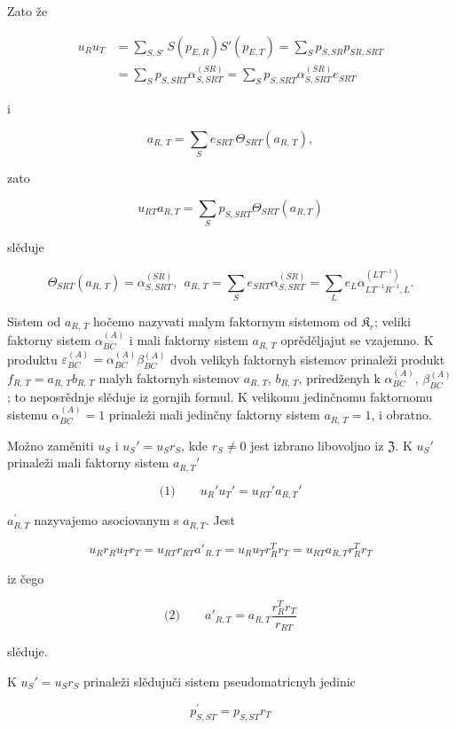 \documentclass[11pt]{article}
\begin{document}
Zato že

\[
\begin{aligned}
u_Ru_T
&=\sum_{S,S'} S(p_{E,R})S'(p_{E,T})
=\sum_S p_{S,SR}p_{SR,SRT}\\
&=\sum_S p_{S,SRT}\alpha_{S,SRT}^{(SR)}
=\sum_S p_{S,SRT}\alpha_{S,SRT}^{(SR)}e_{SRT}
\end{aligned}
\]

i

\[a_{R,\,T} = \sum\limits_{S} e_{SRT}\, \Theta_{SRT} \left(a_{R,\,T}\right),\]

zato

\[u_{RT} a_{R,T} = \sum\limits_{S} p_{S,SRT} \Theta_{SRT} (a_{R,T})\]

slěduje

\[\Theta_{SRT}(a_{R,\,T}) = \alpha_{S,SRT}^{(SR)}, ~~ a_{R,\,T} = \sum\limits_{S} e_{SRT} \alpha_{S,SRT}^{(SR)} = \sum\limits_{L} e_{L} \alpha_{LT^{-1}R^{-1},L}^{(LT^{-1})}.\]

Sistem od \(a_{R,\,T}\) hočemo nazyvati malym faktornym sistemom od \(\mathfrak K_r\); veliki faktorny sistem \(\alpha_{BC}^{(A)}\) i mali faktorny sistem \(a_{R,\,T}\) oprěděljajut se vzajemno. K produktu \(\varepsilon_{BC}^{(A)} = \alpha_{BC}^{(A)} \beta_{BC}^{(A)}\) dvoh velikyh faktornyh sistemov prinaleži produkt \(f_{R,\,T} = a_{R,\,T}b_{R,\,T}\) malyh faktornyh sistemov \(a_{R,\,T}\), \(b_{R,\,T}\), priredženyh k \(\alpha_{BC}^{(A)}\), \(\beta_{BC}^{(A)}\); to neposrědnje slěduje iz gornjih formul. K velikomu jedinčnomu faktornomu sistemu \(\alpha_{BC}^{(A)} = 1\) prinaleži mali jedinčny faktorny sistem \(a_{R,\,T} = 1\), i obratno.

Možno zaměniti \(u_S\) i \(u_S'=u_Sr_S\), kde \(r_S\neq 0\) jest izbrano libovoljno iz \(\mathfrak Z\). K \(u_S'\) prinaleži mali faktorny sistem \(a_{R,T}'\)

\[
\text{(1)}\qquad u_R'u_T'=u_{RT}'a_{R,T}'
\]

\(a_{R,T}^{\prime}\) nazyvajemo asociovanym s \(a_{R,T}\). Jest

\[u_R r_R u_T r_T = u_{RT} r_{RT} a'_{R,T} = u_R u_T r_R^T r_T = u_{RT} a_{R,T} r_R^T r_T\]

iz čego

\[
\text{(2)}\qquad a'_{R,T}=a_{R,T}\frac{r_R^T r_T}{r_{RT}}
\]

slěduje.

K \(u_S' = u_S r_S\) prinaleži slědujuči sistem pseudomatricnyh jedinic

\[p_{S,ST}^{\prime}=p_{S,ST}r_{T}\]
\end{document}
